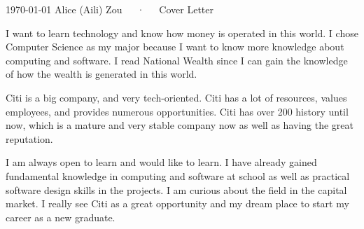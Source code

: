 \documentclass[11pt, a4paper]{awesome-cv}
\begin{document}
\makecvheader[R]

\makecvfooter
  {\today}
  {Alice (Aili) Zou~~~·~~~Cover Letter}
  {}

\makelettertitle

\begin{cvletter}

I want to learn technology and know how money is operated in this world. I chose Computer Science as my major because I want to know more knowledge about computing and software. I read National Wealth since I can gain the knowledge of how the wealth is generated in this world. 

Citi is a big company, and very tech-oriented. Citi has a lot of resources, values employees, and provides numerous opportunities. Citi has over 200 history until now, which is a mature and very stable company now as well as having the great reputation.

I am always open to learn and would like to learn. I have already gained fundamental knowledge in computing and software at school as well as practical software design skills in the projects. I am curious about the field in the capital market. I really see Citi as a great opportunity and my dream place to start my career as a new graduate.

\end{cvletter}


\makeletterclosing
\end{document}
